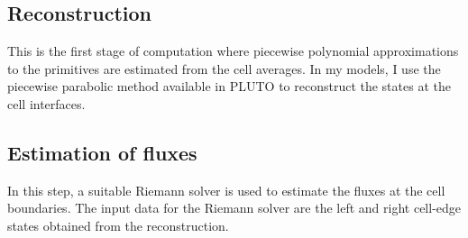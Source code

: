 \subsection{Reconstruction}
This is the first stage of computation where piecewise polynomial approximations to the primitives are estimated from the cell averages. In my models, I use the piecewise parabolic method available in PLUTO \citep{mignone05} to reconstruct the states at the cell interfaces. 


 

\subsection{Estimation of fluxes}
 In this step, a suitable Riemann solver is used to estimate the fluxes at the cell boundaries. The input data for the Riemann solver are the left and right cell-edge states obtained from the reconstruction. 

